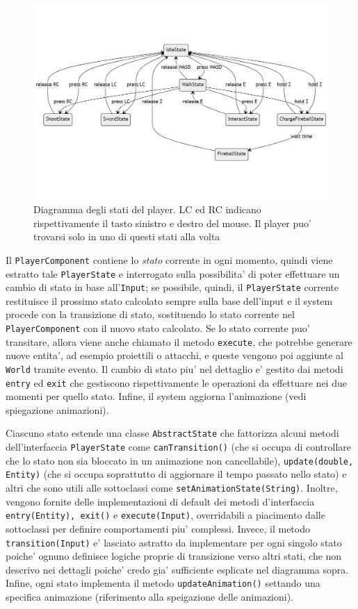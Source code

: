 \documentclass[a4paper,12pt]{report}
\begin{document}
\begin{figure}[h]
	\centering
	\includegraphics[width=\textwidth]{uml/player_states.png}
	\caption{Diagramma degli stati del player. LC ed RC indicano rispettivamente il tasto sinistro e destro del mouse. Il player puo' trovarsi solo in uno di questi stati alla volta} 
\end{figure}

Il \texttt{PlayerComponent} contiene lo \textit{stato} corrente in ogni momento, quindi viene estratto tale \texttt{PlayerState} e interrogato sulla possibilita' di poter effettuare un cambio di stato in base all'\texttt{Input}; se possibile, quindi, il \texttt{PlayerState} corrente restituisce il prossimo stato calcolato sempre sulla base dell'input e il system procede con la transizione di stato, sostituendo lo stato corrente nel \texttt{PlayerComponent} con il nuovo stato calcolato. Se lo stato corrente puo' transitare, allora viene anche chiamato il metodo \texttt{execute}, che potrebbe generare nuove entita', ad esempio proiettili o attacchi, e queste vengono poi aggiunte al \texttt{World} tramite evento. Il cambio di stato piu' nel dettaglio e' gestito dai metodi \texttt{entry} ed \texttt{exit} che gestiscono rispettivamente le operazioni da effettuare nei due momenti per quello stato. Infine, il system aggiorna l'animazione (vedi spiegazione animazioni). 

Ciascuno stato estende una classe \texttt{AbstractState} che fattorizza alcuni metodi dell'interfaccia \texttt{PlayerState} come \texttt{canTransition()} (che si occupa di controllare che lo stato non sia bloccato in un animazione non cancellabile), \texttt{update(double, Entity)} (che si occupa soprattutto di aggiornare il tempo passato nello stato) e altri che sono utili alle sottoclassi come \texttt{setAnimationState(String)}. Inoltre, vengono fornite delle implementazioni di default dei metodi d'interfaccia \texttt{entry(Entity), \texttt{exit()}} e \texttt{execute(Input)}, overridabili a piacimento dalle sottoclassi per definire comportamenti piu' complessi. Invece, il metodo \texttt{transition(Input)} e' lasciato astratto da implementare per ogni singolo stato poiche' ognuno definisce logiche proprie di transizione verso altri stati, che non descrivo nei dettagli poiche' credo gia' sufficiente esplicate nel diagramma sopra. Infine, ogni stato implementa il metodo \texttt{updateAnimation()} settando una specifica animazione (riferimento alla speigazione delle animazioni).
\end{document}
